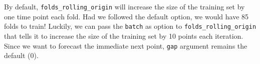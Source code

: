 \documentclass[12pt, krantz2,]{krantz}
\newenvironment{Shaded}{\begin{snugshade}}{\end{snugshade}}
\newcommand{\DecValTok}[1]{\textcolor[rgb]{0.06,0.06,0.06}{#1}}
\newcommand{\KeywordTok}[1]{\textcolor[rgb]{0.27,0.27,0.27}{\textbf{#1}}}
\newcommand{\NormalTok}[1]{#1}
\newcommand{\OperatorTok}[1]{\textcolor[rgb]{0.43,0.43,0.43}{\textbf{#1}}}
\newcommand{\StringTok}[1]{\textcolor[rgb]{0.5,0.5,0.5}{#1}}
\theoremstyle{definition}
\theoremstyle{definition}
\theoremstyle{definition}
\newcommand{\1}{\mathbbm{1}}
\begin{document}
\begin{Shaded}
\end{Shaded}

By default, \texttt{folds\_rolling\_origin} will increase the size of the training set by
one time point each fold. Had we followed the default option, we would have 85
folds to train! Luckily, we can pass the \texttt{batch} as option to
\texttt{folds\_rolling\_origin} that tells it to increase the size of the training set by
10 points each iteration. Since we want to forecast the immediate next point,
\texttt{gap} argument remains the default (0).
\end{document}
